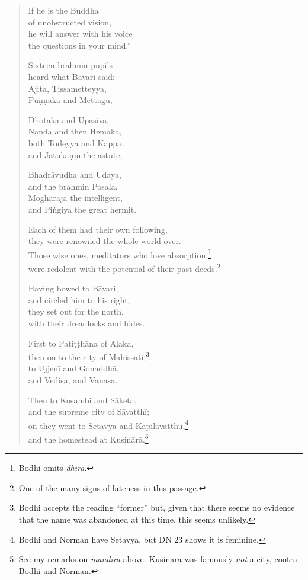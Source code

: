 \documentclass[12pt,openany]{book}%
\begin{document}
\begin{verse}
If he is the Buddha \\
of unobstructed vision, \\
he will answer with his voice \\
the questions in your mind.” 

Sixteen brahmin pupils \\
heard what \textsanskrit{Bāvari} said: \\
Ajita, Tissametteyya, \\
\textsanskrit{Puṇṇaka} and \textsanskrit{Mettagū}, 

Dhotaka and Upasiva, \\
Nanda and then Hemaka, \\
both Todeyya and Kappa, \\
and \textsanskrit{Jatukaṇṇī} the astute, 

\textsanskrit{Bhadrāvudha} and Udaya, \\
and the brahmin Posala, \\
\textsanskrit{Mogharājā} the intelligent, \\
and \textsanskrit{Piṅgiya} the great hermit. 

Each of them had their own following, \\
they were renowned the whole world over. \\
Those wise ones, meditators who love absorption,\footnote{Bodhi omits \textit{\textsanskrit{dhīrā}}. } \\
were redolent with the potential of their past deeds.\footnote{One of the many signs of lateness in this passage. } 

Having bowed to \textsanskrit{Bāvari}, \\
and circled him to his right, \\
they set out for the north, \\
with their dreadlocks and hides. 

First to \textsanskrit{Patiṭṭhāna} of \textsanskrit{Aḷaka}, \\
then on to the city of Mahissati;\footnote{Bodhi accepts the reading “former” but, given that there seems no evidence that the name was abandoned at this time, this seems unlikely. } \\
to \textsanskrit{Ujjenī} and \textsanskrit{Gonaddhā}, \\
and Vedisa, and Vanasa. 

Then to Kosambi and \textsanskrit{Sāketa}, \\
and the supreme city of \textsanskrit{Sāvatthī}; \\
on they went to \textsanskrit{Setavyā} and Kapilavatthu,\footnote{Bodhi and Norman have Setavya, but DN 23 shows it is feminine. } \\
and the homestead at \textsanskrit{Kusinārā}.\footnote{See my remarks on \textit{mandira} above. \textsanskrit{Kusinārā} was famously \emph{not} a city, contra Bodhi and Norman. } 


\end{verse}
\end{document}

